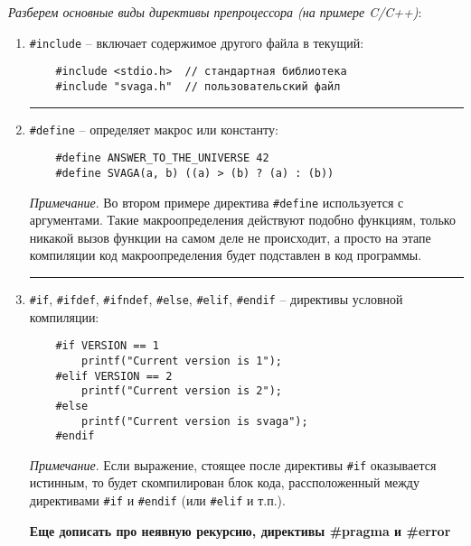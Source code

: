 \textit {Разберем основные виды директивы препроцессора (на примере C/C++)}:
\begin{enumerate}[font=\footnotesize, noitemsep, topsep=0pt, partopsep=0pt]

\vspace{5pt} \hrule \vspace{5pt}
	\item \verb|#include| -- включает содержимое другого файла в текущий: \par
	\begin{verbatim}
	#include <stdio.h>  // стандартная библиотека
	#include "svaga.h"  // пользовательский файл
	\end{verbatim}

\vspace{5pt} \hrule \vspace{5pt}
	\item \verb|#define| -- определяет макрос или константу: \par
	\begin{verbatim}
	#define ANSWER_TO_THE_UNIVERSE 42
	#define SVAGA(a, b) ((a) > (b) ? (a) : (b))
	\end{verbatim}
\textit{Примечание}. Во втором примере директива \verb|#define| используется с аргументами. Такие макроопределения действуют подобно функциям, только никакой вызов функции на самом деле не происходит, а просто на этапе компиляции код макроопределения будет подставлен в код программы.

\vspace{5pt} \hrule \vspace{5pt}
	\item \verb|#if|, \verb|#ifdef|, \verb|#ifndef|, \verb|#else|, \verb|#elif|, \verb|#endif| -- директивы условной компиляции: \par
	\begin{verbatim}
	#if VERSION == 1
	    printf("Current version is 1");
	#elif VERSION == 2
	    printf("Current version is 2");
	#else
	    printf("Current version is svaga");
	#endif
	\end{verbatim}
\textit{Примечание}. Если выражение, стоящее после директивы \verb|#if| оказывается истинным, то будет скомпилирован блок кода, рассположенный между директивами \verb|#if| и \verb|#endif| (или \verb|#elif| и т.п.).

\textbf{\LARGE Еще дописать про неявную рекурсию, директивы \#pragma и \#error}

\end{enumerate}

